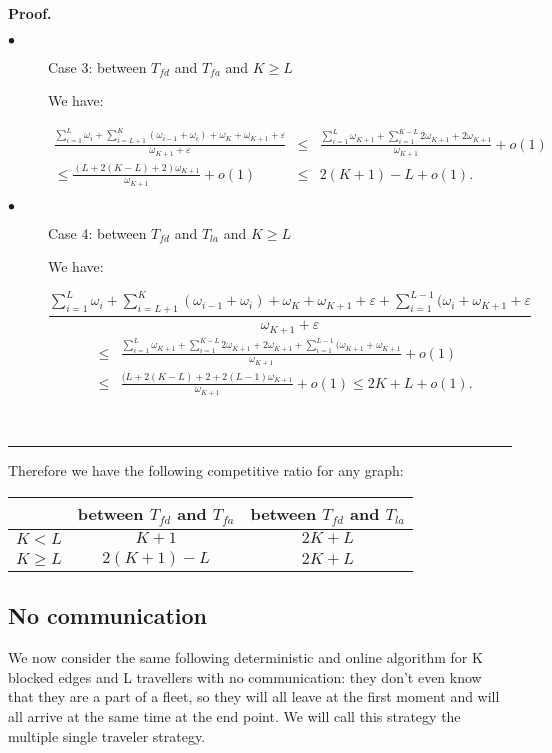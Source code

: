 \documentclass[a4paper, 10pt]{article}
\newenvironment{proof}[1][Proof]{\textbf{#1.} }{\ \rule{0.5em}{0.5em}}
\begin{document}
\begin{proof}
\begin{description}
\item[$\bullet$] Case 3: between $T_{fd}$ and $T_{fa}$ and $K \geq L$

We have: 

\begin{eqnarray}
\frac {\sum_{i=1}^{L} \omega_{i} + \sum_{i=L+1}^{K}(\omega_{i-1} + \omega_{i} ) + \omega_{K} + \omega_{K+1} + \varepsilon} {\omega_{K+1} + \varepsilon} 
&\leq& \frac {\sum_{i=1}^{L} \omega_{K+1} + \sum_{i=1}^{K-L}2\omega_{K+1} + 2\omega_{K+1}}{\omega_{K+1}} + o(1) \nonumber\\
\leq \frac {(L + 2(K - L) + 2)\omega_{K+1}}{\omega_{K+1}} + o(1)
&\leq& 2(K + 1 ) - L + o(1).\nonumber
\end{eqnarray}

\item[$\bullet$] Case 4: between $T_{fd}$ and $T_{la}$ and $K \geq L$

We have:

\[
\frac {\sum_{i=1}^{L} \omega_{i} + \sum_{i=L+1}^{K}(\omega_{i-1} + \omega_{i} ) + \omega_{K} + \omega_{K+1} + \varepsilon + \sum_{i=1}^{L-1}(\omega_{i} + \omega_{K+1} + \varepsilon } {\omega_{K+1} + \varepsilon} 
\]
\begin{eqnarray}
&\leq& \frac {\sum_{i=1}^{L} \omega_{K+1} + \sum_{i=1}^{K-L}2\omega_{K+1} + 2\omega_{K+1} + \sum_{i=1}^{L-1}(\omega_{K+1} + \omega_{K+1}} {\omega_{K+1}} + o(1) \nonumber\\
&\leq& \frac {(L + 2(K - L) + 2 + 2(L-1)\omega_{K+1}}{\omega_{K+1}} + o(1)
 \leq 2K + L + o(1).\nonumber
\end{eqnarray}

\end{description}
\end{proof}

Therefore we have the following competitive ratio for any graph:

\begin{center}
\begin{tabular}{|c|c|c|}
\hline
 & between $T_{fd}$ and $T_{fa}$  & between $T_{fd}$ and $ T_{la}$ \\ 
\hline
 ${K<L}$  & ${K + 1}$ & ${ 2K + L}$   \\ 
\hline
 ${K \geq L}$  & ${2(K+1) - L}$ & ${2K + L}$   \\ 
\hline
\end{tabular}
\end{center}

\subsection{No communication}
We now consider the same following deterministic and online algorithm for K blocked edges and L travellers with no communication: they don't even know that they are a part of a fleet, so they will all leave at the first moment and will all arrive at the same time at the end point. We will call this strategy the multiple single traveler strategy.
\end{document}
